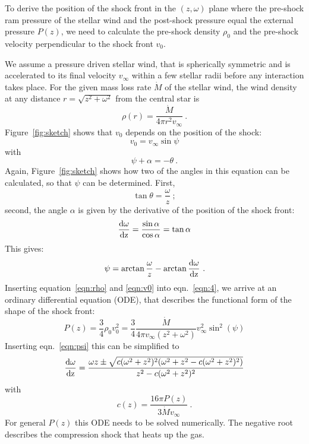 To derive the position of the shock front in the $(z, \omega)$ plane where the pre-shock ram pressure of the stellar wind and the post-shock pressure equal the external pressure $P(z)$, we need to calculate the pre-shock density $\rho_0$ and the pre-shock velocity perpendicular to the shock front $v_0$.

We assume a pressure driven stellar wind, that is spherically symmetric and is accelerated to its final velocity $v_{\infty}$ within a few stellar radii before any interaction takes place. For the given mass loss rate $\dot M$ of the stellar wind, the wind density at any distance $r=\sqrt{z^2+\omega^2}$ from the central star is 
\begin{equation}\label{eqn:rho}
\rho(r) = \frac{\dot M}{4 \pi r^2 v_{\infty}}\ .
\end{equation}
Figure~\ref{fig:sketch} shows that $v_0$ depends on the position of the shock:
\begin{equation}
\label{eqn:v0}v_0 = v_{\infty} \sin \psi
\end{equation}
with 
\begin{equation}\label{eqn:angle}
\psi+\alpha = - \theta \ .
\end{equation}
Again, Figure~\ref{fig:sketch} shows how two of the angles in this equation can be calculated, so that $\psi$ can be determined. First,
\begin{equation}\label{eqn:theta}
\tan\theta = \frac{\omega}{z}\ ;
\end{equation}
second, the angle $\alpha$ is given by the derivative of the position of the shock front:
\begin{equation}\label{eqn:deriv}
\frac{\rm{d}\omega}{\rm{d}z} = \frac{\sin \alpha}{\cos \alpha} = \tan{\alpha}
\end{equation}
This gives:
\begin{equation}\label{eqn:psi}
\psi = \arctan{\frac{\omega}{z}} - \arctan{\frac{\rm{d}\omega}{\rm{d}z}}\ .
\end{equation}
Inserting equation~\ref{eqn:rho} and \ref{eqn:v0} into eqn.~\ref{eqn:4}, we arrive at an ordinary differential equation (ODE), that describes the functional form of the shape of the shock front:
\begin{equation}
P(z) = \frac{3}{4}\rho_0v_0^2 = \frac{3}{4} \frac{\dot{M}}{4\pi v_{\infty}(z^2+\omega^2)} v_{\infty}^2 \sin^2(\psi)
\end{equation}
Inserting eqn.~\ref{eqn:psi} this can be simplified to
\begin{equation}\label{eqn:ode}
\frac{\rm{d}\omega}{\rm{d}z} = \frac{\omega z \pm \sqrt{c (\omega^2+z^2)^2 (\omega^2+z^2-c(\omega^2+z^2)^2)}}{z^2 - c(\omega^2+z^2)^2}
\end{equation}
with
\begin{equation}
c(z) = \frac{16\pi P(z)}{3 \dot{M} v_{\infty}}\ .
\end{equation}
For general $P(z)$ this ODE needs to be solved numerically. The negative root describes the compression shock that heats up the gas.